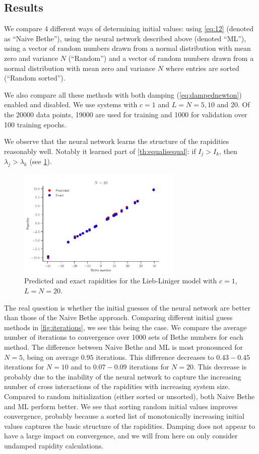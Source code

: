 \documentclass[11pt, a4paper]{report} %
\begin{document}
\subsection{Results}
We compare 4 different ways of determining initial values: using \cref{eq:12} (denoted as ``Naive Bethe''), using the neural network described above (denoted ``ML''), using a vector of random numbers drawn from a normal distribution with mean zero and variance \(N\) (``Random'') and a vector of random numbers drawn from a normal distribution with mean zero and variance \(N\) where entries are sorted (``Random sorted'').

We also compare all these methods with both damping (\cref{eq:dampednewton}) enabled and disabled. We use systems with \(c=1\) and \(L=N=5,10\) and 20.
Of the 20000 data points, 19000 are used for training and 1000 for validation over 100 training epochs.

We observe that the neural network learns the structure of the rapidities reasonably well.
Notably it learned part of \cref{th:equalisequal}: if \(I_j >I_k\), then \(\lambda_j > \lambda_k\) (see \cref{fig:rapidities}).

\begin{figure}[tb]
  \centering
  \includegraphics[width=0.70\textwidth]{rapidities_20.pdf}
  \caption{Predicted and exact rapidities for the Lieb-Liniger model with \(c=1\), \(L=N=20\).}\label{fig:rapidities}
\end{figure}

The real question is whether the initial guesses of the neural network are better than those of the Naive Bethe approach.
Comparing different initial guess methods in \cref{fig:iterations}, we see this being the case.
We compare the average number of iterations to convergence over 1000 sets of Bethe numbers for each method.
The difference between Naive Bethe and ML is most pronounced for \(N=5\), being on average \(0.95\) iterations.
This difference decreases to \(0.43-0.45\) iterations for \(N=10\) and to \(0.07-0.09\) iterations for \(N=20\).
This decrease is probably due to the inability of the neural network to capture the increasing number of cross interactions of the rapidities with increasing system size.
Compared to random initialization (either sorted or unsorted), both Naive Bethe and ML perform better.
We see that sorting random initial values improves convergence, probably because a sorted list of monotonically increasing initial values captures the basic structure of the rapidities.
Damping does not appear to have a large impact on convergence, and we will from here on only consider undamped rapidity calculations.
\end{document}
